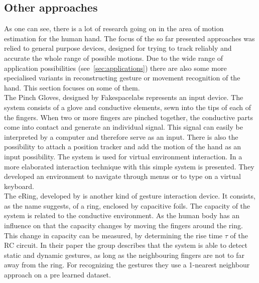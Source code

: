 {\subsection{Other approaches} \label{subsec:approaches:other}
As one can see, there is a lot of research going on in the area of motion estimation for the human hand. The focus of the so far presented approaches was relied to general purpose devices, designed for trying to track reliably and accurate the whole range of possible motions. Due to the wide range of application possibilities (see~\ref{sec:applications}) there are also some more specialised variants in reconstructing gesture or movement recognition of the hand. This section focuses on some of them.\\
The Pinch Gloves, designed by Fakespacelabs  represents an input device. The system consists of a glove and conductive elements, sewn into the tips of each of the fingers. When two or more fingers are pinched together, the conductive parts come into contact and generate an individual signal. This signal can easily be interpreted by a computer and therefore serve as an input. There is also the possibility to attach a position tracker and add the motion of the hand as an input possibility. The system is used for virtual environment interaction. In \cite{bowman2001using} a more elaborated interaction technique with this simple system is presented. They developed an environment to navigate through menus or to type on a virtual keyboard.\\
The eRing, developed by \cite{wilhelm2015ering} is another kind of gesture interaction device. It consists, as the name suggests, of a ring, enclosed by capacitive foils. The capacity of the system is related to the conductive environment. As the human body has an influence on that the capacity changes by moving the fingers around the ring. This change in capacity can be measured, by determining the rise time $ \tau $ of the RC circuit. In their paper the group describes that the system is able to detect static and dynamic gestures, as long as the neighbouring fingers are not to far away from the ring. For recognizing the gestures they use a 1-nearest neighbour approach on a pre learned dataset.\\
}
